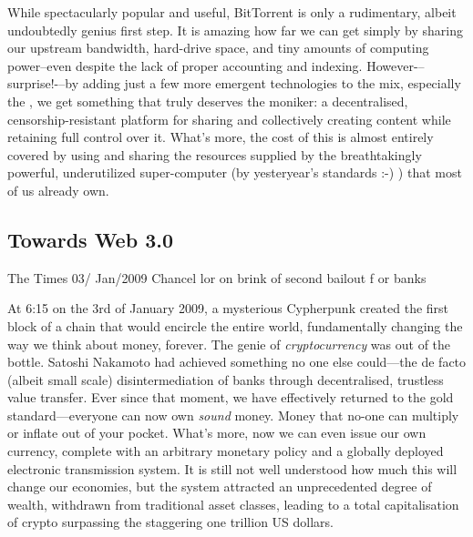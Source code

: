 While spectacularly popular and useful, BitTorrent is only a rudimentary, albeit undoubtedly genius first step. It is amazing how far we can get simply by sharing our upstream bandwidth, hard-drive space, and tiny amounts of computing power–even despite the lack of proper accounting and indexing. However-–surprise!-–by adding just a few more emergent technologies to the mix, especially the , we get something that truly deserves the  moniker: a decentralised, censorship-resistant platform for sharing and collectively creating content while retaining full control over it. What's more, the cost of this is almost entirely covered by using and sharing the resources supplied by the breathtakingly powerful, underutilized super-computer (by yesteryear's standards :-) ) that most of us already own.

\subsection{Towards Web 3.0 \statusgreen}\label{sec:towards-web3}


\begin{centerverbatim}
The Times 03/
Jan/2009 Chancel
lor on brink of 
second bailout f
or banks
\end{centerverbatim}

At 6:15 on the 3rd of January 2009, a mysterious Cypherpunk created the first block of a chain that would encircle the entire world, fundamentally changing the way we think about money, forever. The genie of \emph{cryptocurrency} was out of the bottle. Satoshi Nakamoto had achieved something no one else could—the de facto (albeit small scale) disintermediation of banks through decentralised, trustless value transfer. Ever since that moment, we have effectively returned to the gold standard—everyone can now own \emph{sound} money. Money that no-one can multiply or inflate out of your pocket. What's more, now we can even issue our own currency, complete with an arbitrary monetary policy and a globally deployed electronic transmission system. It is still not well understood how much this will change our economies, but the system attracted an unprecedented degree of wealth, withdrawn from traditional asset classes, leading to a total capitalisation of crypto surpassing the staggering one trillion US dollars.

